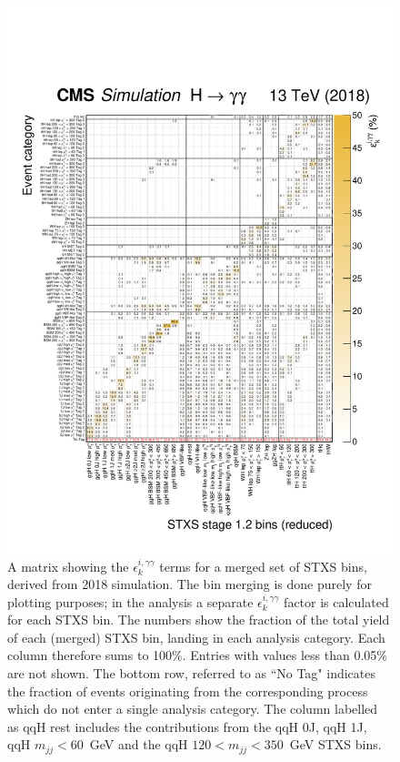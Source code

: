 \begin{figure}
  \centering
  \includegraphics[width=1\textwidth]{Figures/app_matrices/migrationMatrix_2018_thesis.pdf}
  \caption[Efficiency times acceptance matrix from 2018 simulation]
  {
    A matrix showing the $\epsilon^{i,\gamma\gamma}_{k}$ terms for a merged set of STXS bins, derived from 2018 simulation. The bin merging is done purely for plotting purposes; in the analysis a separate $\epsilon^{i,\gamma\gamma}_{k}$ factor is calculated for each STXS bin. The numbers show the fraction of the total yield of each (merged) STXS bin, landing in each analysis category. Each column therefore sums to 100\%. Entries with values less than 0.05\% are not shown. The bottom row, referred to as ``No Tag" indicates the fraction of events originating from the corresponding process which do not enter a single analysis category. The column labelled as qqH rest includes the contributions from the qqH 0J, qqH 1J, qqH $m_{jj}<60$~GeV and the qqH $120<m_{jj}<350$~GeV STXS bins.
  }
  \label{fig:ea_2017}
\end{figure}